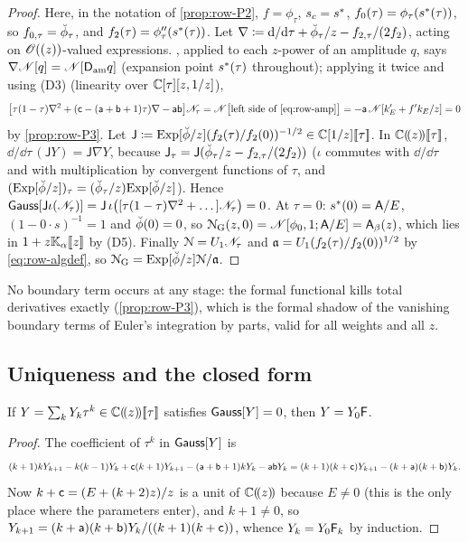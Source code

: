 \begin{proof}
Here, in the notation of \cref{prop:row-P2}, $f=\phi_\tau$, $s_c=s^{\ast}$, $f_0(\tau)=\phi_\tau(s^{\ast}(\tau))$, so $f_{0,\tau}=\breve{\phi}_\tau$, and $f_2(\tau)=\phi_\tau''(s^{\ast}(\tau))$. Let $\nabla\coloneqq\mathrm{d}/\mathrm{d}\tau+\breve{\phi}_\tau/z-f_{2,\tau}/(2f_2)$, acting on $\mathscr{O}((z))$-valued expressions. , applied to each $z$-power of an amplitude $q$, says $\nabla\mathscr{N}[q]=\mathscr{N}[\mathsf{D}_{\mathrm{am}} q]$ (expansion point $s^{\ast}(\tau)$ throughout); applying it twice and using (D3) (linearity over $\mathbb{C}[\tau][z,1/z]$),
\[
\big[\tau(1-\tau)\nabla^2+(\mathsf{c}-(\mathsf{a}+\mathsf{b}+1)\tau)\nabla-\mathsf{a}\mathsf{b}\big]\mathscr{N}_{\tau}=\mathscr{N}\big[\text{left side of \eqref{eq:row-amp}}\big]=-\mathsf{a}\,\mathscr{N}[k_E'+f'k_E/z]=0
\]
by \cref{prop:row-P3}. Let $\mathsf{J}\coloneqq\mathrm{Exp}[\breve{\phi}/z](f_2(\tau)/f_2(0))^{-1/2}\in\mathbb{C}[1/z][\![ \tau ]\!]$. In $\mathbb{C}(\!(z)\!)[\![ \tau ]\!]$, $\dd/\dd\tau\,(\mathsf{J}Y)=\mathsf{J}\nabla Y$, because $\mathsf{J}_\tau=\mathsf{J}(\breve{\phi}_\tau/z-f_{2,\tau}/(2f_2))$ ($\iota$ commutes with $\dd/\dd\tau$ and with multiplication by convergent functions of $\tau$, and $(\mathrm{Exp}[\breve{\phi}/z])_\tau=(\breve{\phi}_\tau/z)\mathrm{Exp}[\breve{\phi}/z]$). Hence $\mathsf{Gauss}[\mathsf{J}\iota(\mathscr{N}_{\tau})]=\mathsf{J}\,\iota\big([\tau(1-\tau)\nabla^2+\dots]\mathscr{N}_{\tau}\big)=0$. At $\tau=0$: $s^{\ast}(0)=\mathsf{A}/E$, $(1-0\cdot s)^{-1}=1$ and $\breve{\phi}(0)=0$, so $\mathcal{N}_{\mathrm{G}}(z,0)=\mathscr{N}[\phi_0,1;\mathsf{A}/E]=\mathsf{A}_{\beta}(z)$, which lies in $1+z\mathbb{K}_{\alpha}[\![ z ]\!]$ by (D5). Finally $\mathcal{N}=U_1\mathscr{N}_{\tau}$ and $\mathfrak{a}=U_1(f_2(\tau)/f_2(0))^{1/2}$ by \eqref{eq:row-algdef}, so $\mathcal{N}_{\mathrm{G}}=\mathrm{Exp}[\breve{\phi}/z]\mathcal{N}/\mathfrak{a}$.
\end{proof}

No boundary term occurs at any stage: the formal functional kills total derivatives exactly (\cref{prop:row-P3}), which is the formal shadow of the vanishing boundary terms of Euler's integration by parts, valid for all weights and all $z$.

\subsection{Uniqueness and the closed form}
\label{sec:row-closed}

\begin{lem}
\label{lem:row-unique}
If $Y=\sum_kY_k\tau^k\in\mathbb{C}(\!(z)\!)[\![ \tau ]\!]$ satisfies $\mathsf{Gauss}[Y]=0$, then $Y=Y_0\mathsf{F}$.
\end{lem}

\begin{proof}
The coefficient of $\tau^k$ in $\mathsf{Gauss}[Y]$ is
\[
(k+1)kY_{k+1}-k(k-1)Y_k+\mathsf{c}(k+1)Y_{k+1}-(\mathsf{a}+\mathsf{b}+1)kY_k-\mathsf{a}\mathsf{b} Y_k=(k+1)(k+\mathsf{c})Y_{k+1}-(k+\mathsf{a})(k+\mathsf{b})Y_k .
\]
Now $k+\mathsf{c}=(E+(k+2)z)/z$ is a unit of $\mathbb{C}(\!(z)\!)$ because $E\neq0$ (this is the only place where the parameters enter), and $k+1\neq0$, so $Y_{k+1}=(k+\mathsf{a})(k+\mathsf{b})Y_k/((k+1)(k+\mathsf{c}))$, whence $Y_k=Y_0\mathsf{F}_k$ by induction.
\end{proof}

